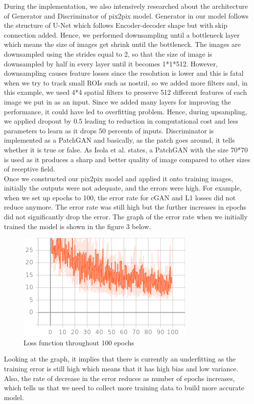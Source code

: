 \documentclass[conference]{IEEEtran}
\begin{document}
During the implementation, we also intensively researched about the architecture of Generator and Discriminator of pix2pix model. Generator in our model follows the structure of U-Net which follows Encoder-decoder shape but with skip connection added. Hence, we performed downsampling until a bottleneck layer which means the size of images get shrink until the bottleneck. The images are downsampled using the strides equal to 2, so that the size of image is downsampled by half in every layer until it becomes 1*1*512. However, downsampling causes feature losses since the resolution is lower and this is fatal when we try to track small ROIs such as nostril, so we added more filters and, in this example, we used 4*4 spatial filters to preserve 512 different features of each image we put in as an input. Since we added many layers for improving the performance, it could have led to overfitting problem. Hence, during upsampling, we applied dropout by 0.5 leading to reduction in computational cost and less parameters to learn as it drops 50 percents of inputs. Discriminator is implemented as a PatchGAN and basically, as the patch goes around, it tells whether it is true or false. As Isola et al. \cite{b1} states, a PatchGAN with the size 70*70 is used as it produces a sharp and better quality of image compared to other sizes of receptive field.  \\

Once we constructed our pix2pix model and applied it onto training images, initially the outputs were not adequate, and the errors were high. For example, when we set up epochs to 100, the error rate for cGAN and L1 losses did not reduce anymore. The error rate was still high but the further increases in epochs did not significantly drop the error. The graph of the error rate when we initially trained the model is shown in the figure 3 below.\\
\begin{figure}[htbp]
\centerline{\includegraphics[scale=0.7]{gen_total_loss.png}}
\caption{Loss function throughout 100 epochs}
\label{fig}
\end{figure}
Looking at the graph, it implies that there is currently an underfitting as the training error is still high which means that it has high bias and low variance. Also, the rate of decrease in the error reduces as number of epochs increases, which tells us that we need to collect more training data to build more accurate model.\\
\end{document}
